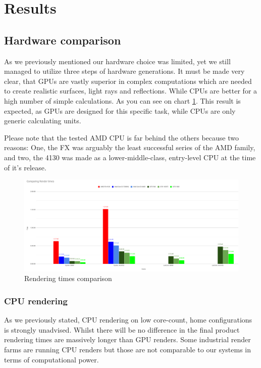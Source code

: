 \documentclass[conference]{IEEEtran}
\begin{document}
\section{Results}
\subsection{Hardware comparison}
As we previously mentioned our hardware choice was limited, yet we still managed to utilize three steps of hardware generations. It must be made very clear, that GPUs are vastly superior in complex computations which are needed to create realistic surfaces, light rays and reflections. While CPUs are better for a high number of simple calculations. As you can see on chart \ref{fig:rendering_time_hw_comparison}. This result is expected, as GPUs are designed for this specific task, while CPUs are only generic calculating units.

Please note that the tested AMD CPU is far behind the others because two reasons: One, the FX was arguably the least successful series of the AMD family, and two, the 4130 was made as a lower-middle-class, entry-level CPU at the time of it's release.
\begin{figure}[htbp]
        \centering
        \includegraphics[scale=0.2]{Images/renderingtimes_graph.png}
        \caption{Rendering times comparison}
        \label{fig:rendering_time_hw_comparison}
    \end{figure}

\subsubsection{CPU rendering} \label{cpu_rendering}
    As we previously stated, CPU rendering on low core-count, home configurations is strongly unadvised. Whilst there will be no difference in the final product rendering times are massively longer than GPU renders. Some industrial render farms are running CPU renders but those are not comparable to our systems in terms of computational power.
    
\end{document}
